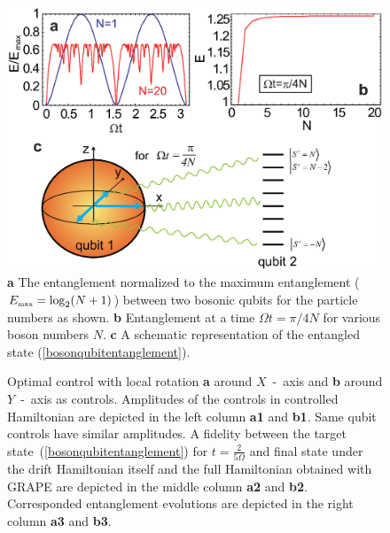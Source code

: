 \documentclass[
aps,%
12pt,%
final,%
notitlepage,%
oneside,%
onecolumn,%
nobibnotes,%
nofootinbib,%
superscriptaddress,%
noshowpacs,%
centertags]%
{revtex4}
\begin{document}
\begin{figure}[t!]
\setcaptionmargin{5mm}
\onelinecaptionsfalse
\begin{center}
    \includegraphics[width=13cm]{fig1.eps}
\end{center}
\label{fig1:entanglement}
\caption{
    {\bf a} The entanglement normalized to the maximum entanglement ($E_{\mbox{\tiny max}} = \log_2 (N+1) $) between two bosonic qubits for the particle numbers as shown. 
    {\bf b} Entanglement at a time $ \Omega t= \pi/4N $ for various boson numbers $ N $.  
    {\bf c} A schematic representation of the entangled state (\ref{bosonqubitentanglement}). 
}
\end{figure}

\newpage

\begin{figure}[t!]
\setcaptionmargin{5mm}
\onelinecaptionsfalse
{}
\caption{
    Optimal control with local rotation {\bf a} around $X$~-~axis and {\bf b} around $Y$~-~axis as controls. Amplitudes of the controls in controlled Hamiltonian are depicted in the left column {\bf a1} and {\bf b1}. Same qubit controls have similar amplitudes. A fidelity between the target state~(\ref{bosonqubitentanglement}) for $t=\frac{2}{5\Omega}$ and final state under the drift Hamiltonian itself and the full Hamiltonian obtained with GRAPE are depicted in the middle column {\bf a2} and {\bf b2}. Corresponded entanglement evolutions are depicted in the right column {\bf a3} and {\bf b3}.
}
\label{fig2:rotation}
\end{figure}
\end{document}
